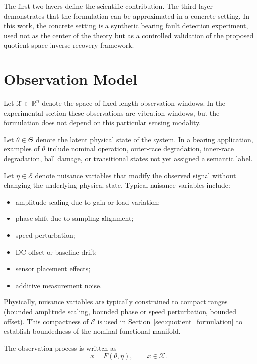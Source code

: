 \documentclass[11pt,letterpaper]{article}
\newcommand{\X}{\ensuremath{\mathcal{X}}}
\newcommand{\ThetaSpace}{\ensuremath{\Theta}}
\newcommand{\EtaSpace}{\ensuremath{\mathcal{E}}}
\newcommand{\R}{\ensuremath{\mathbb{R}}}
\begin{document}
The first two layers define the scientific contribution. The third layer demonstrates that the formulation can be approximated in a concrete setting. In this work, the concrete setting is a synthetic bearing fault detection experiment, used not as the center of the theory but as a controlled validation of the proposed quotient-space inverse recovery framework.

\section{Observation Model}
\label{sec:observation_model}

Let \(\X \subset \R^n\) denote the space of fixed-length observation windows. In the experimental section these observations are vibration windows, but the formulation does not depend on this particular sensing modality.

Let \(\theta \in \ThetaSpace\) denote the latent physical state of the system. In a bearing application, examples of \(\theta\) include nominal operation, outer-race degradation, inner-race degradation, ball damage, or transitional states not yet assigned a semantic label.

Let \(\eta \in \EtaSpace\) denote nuisance variables that modify the observed signal without changing the underlying physical state. Typical nuisance variables include:

\begin{itemize}
    \item amplitude scaling due to gain or load variation;
    \item phase shift due to sampling alignment;
    \item speed perturbation;
    \item DC offset or baseline drift;
    \item sensor placement effects;
    \item additive measurement noise.
\end{itemize}

Physically, nuisance variables are typically constrained to compact ranges (bounded amplitude scaling, bounded phase or speed perturbation, bounded offset). This compactness of \(\EtaSpace\) is used in Section~\ref{sec:quotient_formulation} to establish boundedness of the nominal functional manifold.

The observation process is written as
\begin{equation}
    x = F(\theta,\eta), \qquad x \in \X.
    \label{eq:forward_model}
\end{equation}
\end{document}
